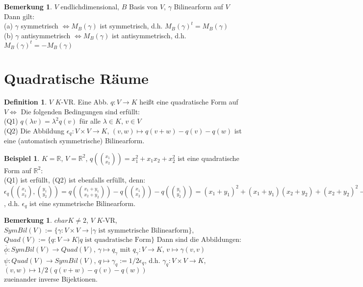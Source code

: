 \documentclass[10pt,a4paper,numbers=endperiod]{scrartcl}
\theoremstyle{definition}
\newtheorem{defi}[satz]{Definition}
\newtheorem{bem}[satz]{Bemerkung}
\newtheorem{bsp}[satz]{Beispiel}
\def\RR{{\mathbb R}}
\begin{document}
\begin{bem}
	$V$ endlichdimensional, $B$ Basis von $V$, $\gamma$ Bilinearform auf $V$\\
	Dann gilt:\\
	(a) $\gamma$ symmetrisch $\Leftrightarrow M_B(\gamma)$ ist symmetrisch, d.h. $M_B(\gamma)^t = M_B(\gamma)$\\
	(b) $\gamma$ antisymmetrisch $\Leftrightarrow M_B(\gamma)$ ist antisymmetrisch, d.h. $M_B(\gamma) ^t = -M_B(\gamma)$
\end{bem}

\section{Quadratische Räume} 

\begin{defi}
	$V$ $K$-VR. Eine Abb. $q: V \rightarrow K$ heißt eine quadratische Form auf $V \Leftrightarrow$ Die folgenden Bedingungen sind erfüllt:\\
	(Q1) $q(\lambda v) = \lambda^2 q(v)$ für alle $\lambda \in K$, $v \in V$\\
	(Q2) Die Abbildung $\epsilon_q: V \times V \rightarrow K$, $(v,w) \mapsto q(v+w) - q(v) - q(w)$ ist eine (automatisch symmetrische) Bilinearform.
\end{defi}

\begin{bsp}
	$K = \RR$, $V = \RR^2$, $q(\binom{x_1}{x_2}) = x_1^2+x_1x_2 + x_2^2$ ist eine quadratische Form auf $\RR^2$:\\
	(Q1) ist erfüllt, (Q2) ist ebenfalls erfüllt, denn:\\
	$\epsilon_q(\binom{x_1}{x_2}, \binom{y_1}{y_2}) = q(\binom{x_1+y_1}{x_2+y_2}) -q(\binom{x_1}{x_2}) - q(\binom{y_1}{y_2}) = (x_1+y_1)^2 + (x_1+y_1)(x_2+y_2)+ (x_2+y_2)^2 - x_1^2 - x_1x_2 -x_2^2-y_1^2 -y_1y_2 -y_2^2 = 2x_1y_1+x_1y_2+x_2y_1+2x_2y_2$, d.h. $\epsilon_q$ ist eine symmetrische Bilinearform.
\end{bsp}

\begin{bem}
	$char K \neq 2$, $V$ $K$-VR, $SymBil(V) := \{\gamma: V \times V \rightarrow | \gamma \text{ ist symmetrische Bilinearform}\}$,\\ $Quad(V) := \{q: V \rightarrow K| q \text{ ist quadratische Form}\}$ Dann sind die Abbildungen:\\ 
	$\overline{\underline{\phi}}: SymBil(V) \rightarrow Quad(V)$, $\gamma \mapsto q_\gamma$ mit $q_\gamma : V \rightarrow K$, $v \mapsto \gamma(v,v)$\\
	$\underline{\psi}: Quad(V) \rightarrow SymBil(V)$, $q \mapsto \gamma_q := 1/2 \epsilon_q$, d.h. $\gamma_q: V \times V \rightarrow K$, $(v,w) \mapsto 1/2 (q(v+w)-q(v)-q(w))$\\
	zueinander inverse Bijektionen.
\end{bem}
\end{document}
